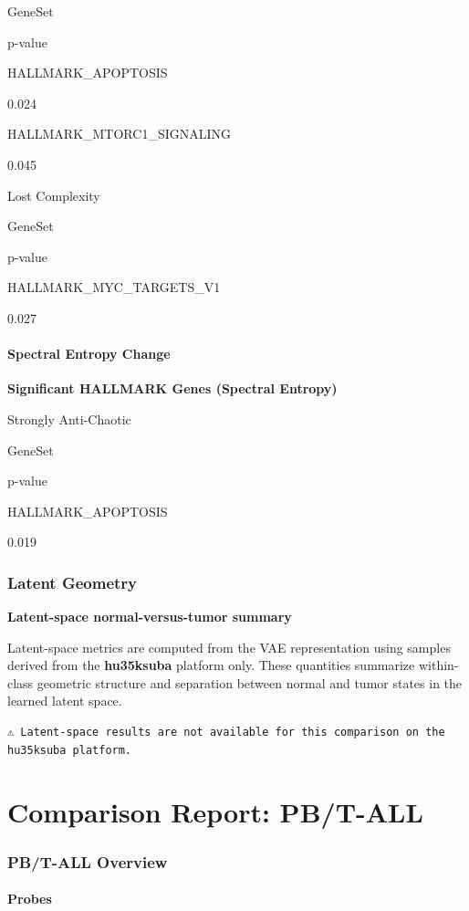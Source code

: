 \documentclass[
  letterpaper,
  DIV=11,
  numbers=noendperiod,
  openany,
  oneside]{scrreprt}
\begin{document}
GeneSet

p-value

HALLMARK\_APOPTOSIS

0.024

HALLMARK\_MTORC1\_SIGNALING

0.045

Lost Complexity

GeneSet

p-value

HALLMARK\_MYC\_TARGETS\_V1

0.027

\subsubsection{Spectral Entropy Change}

\textbf{Significant HALLMARK Genes (Spectral Entropy)}

Strongly Anti-Chaotic

GeneSet

p-value

HALLMARK\_APOPTOSIS

0.019

\subsection{Latent Geometry}

\textbf{Latent-space normal-versus-tumor summary}

Latent-space metrics are computed from the VAE representation using
samples derived from the \textbf{hu35ksuba} platform only. These
quantities summarize within-class geometric structure and separation
between normal and tumor states in the learned latent space.

\begin{verbatim}
⚠️ Latent-space results are not available for this comparison on the hu35ksuba platform.
\end{verbatim}

\chapter{Comparison Report: PB/T-ALL}\label{comparison-report-pbt-all}

\subsection{PB/T-ALL Overview}

\subsubsection{Probes}
\end{document}
